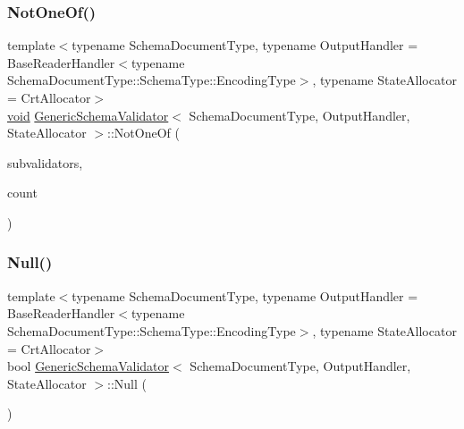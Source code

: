 \mbox{\label{classGenericSchemaValidator_ad4819a91a42d781391760f26014cd315}} 
\subsubsection{\texorpdfstring{Not\+One\+Of()}{NotOneOf()}}
{\footnotesize\ttfamily template$<$typename Schema\+Document\+Type, typename Output\+Handler = Base\+Reader\+Handler$<$typename Schema\+Document\+Type\+::\+Schema\+Type\+::\+Encoding\+Type$>$, typename State\+Allocator = Crt\+Allocator$>$ \\
\hyperlink{imgui__impl__opengl3__loader_8h_ac668e7cffd9e2e9cfee428b9b2f34fa7}{void} \hyperlink{classGenericSchemaValidator}{Generic\+Schema\+Validator}$<$ Schema\+Document\+Type, Output\+Handler, State\+Allocator $>$\+::Not\+One\+Of (\begin{DoxyParamCaption}\item[{I\+Schema\+Validator $\ast$$\ast$}]{subvalidators,  }\item[{\hyperlink{rapidjson_8h_a5ed6e6e67250fadbd041127e6386dcb5}{Size\+Type}}]{count }\end{DoxyParamCaption})\hspace{0.3cm}{\ttfamily [inline]}}

\mbox{\label{classGenericSchemaValidator_a7137af73e934f50c66cbb8a9aa802ea6}} 
\subsubsection{\texorpdfstring{Null()}{Null()}}
{\footnotesize\ttfamily template$<$typename Schema\+Document\+Type, typename Output\+Handler = Base\+Reader\+Handler$<$typename Schema\+Document\+Type\+::\+Schema\+Type\+::\+Encoding\+Type$>$, typename State\+Allocator = Crt\+Allocator$>$ \\
bool \hyperlink{classGenericSchemaValidator}{Generic\+Schema\+Validator}$<$ Schema\+Document\+Type, Output\+Handler, State\+Allocator $>$\+::Null (\begin{DoxyParamCaption}{ }\end{DoxyParamCaption})\hspace{0.3cm}{\ttfamily [inline]}}

